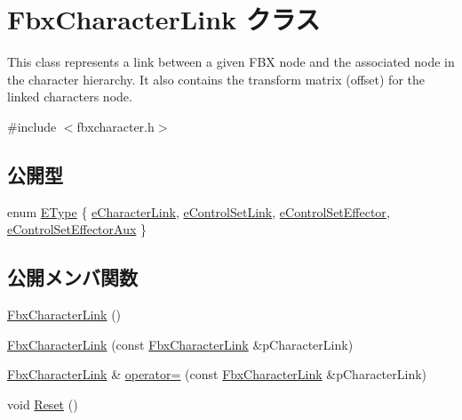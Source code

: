 \hypertarget{class_fbx_character_link}{}\section{Fbx\+Character\+Link クラス}
\label{class_fbx_character_link}


This class represents a link between a given F\+BX node and the associated node in the character hierarchy. It also contains the transform matrix (offset) for the linked character\textquotesingle{}s node.  




{\ttfamily \#include $<$fbxcharacter.\+h$>$}

\subsection*{公開型}
\begin{DoxyCompactItemize}
\item 
enum \hyperlink{class_fbx_character_link_ae90994844e941f231b6be3d59e21cdce}{E\+Type} \{ \hyperlink{class_fbx_character_link_ae90994844e941f231b6be3d59e21cdcea3c6edcc191bd2ae7b38dd3dae622664e}{e\+Character\+Link}, 
\hyperlink{class_fbx_character_link_ae90994844e941f231b6be3d59e21cdcea7be82df8ca326a6f5c9b0ab941eac56a}{e\+Control\+Set\+Link}, 
\hyperlink{class_fbx_character_link_ae90994844e941f231b6be3d59e21cdceab6d996b0d5953868166ee20d85efd04e}{e\+Control\+Set\+Effector}, 
\hyperlink{class_fbx_character_link_ae90994844e941f231b6be3d59e21cdcea6c5f01876533ecb6dfd92b2bd6969666}{e\+Control\+Set\+Effector\+Aux}
 \}
\end{DoxyCompactItemize}
\subsection*{公開メンバ関数}
\begin{DoxyCompactItemize}
\item 
\hyperlink{class_fbx_character_link_ab2f755a75b24f1e1ffbe21f61b4f718f}{Fbx\+Character\+Link} ()
\item 
\hyperlink{class_fbx_character_link_a8f9d5ca289fe6fc60e6d3648112f8dcc}{Fbx\+Character\+Link} (const \hyperlink{class_fbx_character_link}{Fbx\+Character\+Link} \&p\+Character\+Link)
\item 
\hyperlink{class_fbx_character_link}{Fbx\+Character\+Link} \& \hyperlink{class_fbx_character_link_ace29a4d8c4a64bd6325513e6348c2504}{operator=} (const \hyperlink{class_fbx_character_link}{Fbx\+Character\+Link} \&p\+Character\+Link)
\item 
void \hyperlink{class_fbx_character_link_a9d0e6c6b7fc03ccb93283d79f763403f}{Reset} ()
\end{DoxyCompactItemize}
